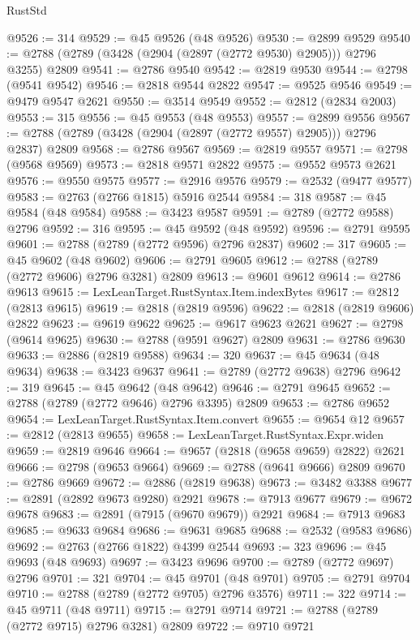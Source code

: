\begin{lexlean}{RustStd}
\begin{coremodule}
@9526 := 314
@9529 := @45 @9526 (@48 @9526)
@9530 := @2899 @9529
@9540 := @2788 (@2789 (@3428 (@2904 (@2897 (@2772 @9530) @2905))) @2796 @3255) @2809
@9541 := @2786 @9540
@9542 := @2819 @9530
@9544 := @2798 (@9541 @9542)
@9546 := @2818 @9544 @2822
@9547 := @9525 @9546
@9549 := @9479 @9547 @2621
@9550 := @3514 @9549
@9552 := @2812 (@2834 @2003)
@9553 := 315
@9556 := @45 @9553 (@48 @9553)
@9557 := @2899 @9556
@9567 := @2788 (@2789 (@3428 (@2904 (@2897 (@2772 @9557) @2905))) @2796 @2837) @2809
@9568 := @2786 @9567
@9569 := @2819 @9557
@9571 := @2798 (@9568 @9569)
@9573 := @2818 @9571 @2822
@9575 := @9552 @9573 @2621
@9576 := @9550 @9575
@9577 := @2916 @9576
@9579 := @2532 (@9477 @9577)
@9583 := @2763 (@2766 @1815) @5916 @2544
@9584 := 318
@9587 := @45 @9584 (@48 @9584)
@9588 := @3423 @9587
@9591 := @2789 (@2772 @9588) @2796
@9592 := 316
@9595 := @45 @9592 (@48 @9592)
@9596 := @2791 @9595
@9601 := @2788 (@2789 (@2772 @9596) @2796 @2837)
@9602 := 317
@9605 := @45 @9602 (@48 @9602)
@9606 := @2791 @9605
@9612 := @2788 (@2789 (@2772 @9606) @2796 @3281) @2809
@9613 := @9601 @9612
@9614 := @2786 @9613
@9615 := LexLeanTarget.RustSyntax.Item.indexBytes
@9617 := @2812 (@2813 @9615)
@9619 := @2818 (@2819 @9596)
@9622 := @2818 (@2819 @9606) @2822
@9623 := @9619 @9622
@9625 := @9617 @9623 @2621
@9627 := @2798 (@9614 @9625)
@9630 := @2788 (@9591 @9627) @2809
@9631 := @2786 @9630
@9633 := @2886 (@2819 @9588)
@9634 := 320
@9637 := @45 @9634 (@48 @9634)
@9638 := @3423 @9637
@9641 := @2789 (@2772 @9638) @2796
@9642 := 319
@9645 := @45 @9642 (@48 @9642)
@9646 := @2791 @9645
@9652 := @2788 (@2789 (@2772 @9646) @2796 @3395) @2809
@9653 := @2786 @9652
@9654 := LexLeanTarget.RustSyntax.Item.convert
@9655 := @9654 @12
@9657 := @2812 (@2813 @9655)
@9658 := LexLeanTarget.RustSyntax.Expr.widen
@9659 := @2819 @9646
@9664 := @9657 (@2818 (@9658 @9659) @2822) @2621
@9666 := @2798 (@9653 @9664)
@9669 := @2788 (@9641 @9666) @2809
@9670 := @2786 @9669
@9672 := @2886 (@2819 @9638)
@9673 := @3482 @3388
@9677 := @2891 (@2892 @9673 @9280) @2921
@9678 := @7913 @9677
@9679 := @9672 @9678
@9683 := @2891 (@7915 (@9670 @9679)) @2921
@9684 := @7913 @9683
@9685 := @9633 @9684
@9686 := @9631 @9685
@9688 := @2532 (@9583 @9686)
@9692 := @2763 (@2766 @1822) @4399 @2544
@9693 := 323
@9696 := @45 @9693 (@48 @9693)
@9697 := @3423 @9696
@9700 := @2789 (@2772 @9697) @2796
@9701 := 321
@9704 := @45 @9701 (@48 @9701)
@9705 := @2791 @9704
@9710 := @2788 (@2789 (@2772 @9705) @2796 @3576)
@9711 := 322
@9714 := @45 @9711 (@48 @9711)
@9715 := @2791 @9714
@9721 := @2788 (@2789 (@2772 @9715) @2796 @3281) @2809
@9722 := @9710 @9721

\end{coremodule}
\end{lexlean}
